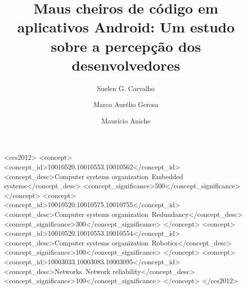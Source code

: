 \documentclass[sigconf]{acmart}
\begin{document}
\title{Maus cheiros de código em aplicativos Android: Um estudo sobre a percepção dos desenvolvedores}


\author{Suelen G. Carvalho}

\author{Marco Aurélio Gerosa}

\author{Maurício Aniche}



\begin{abstract}

\end{abstract}

%
%
\begin{CCSXML}
<ccs2012>
 <concept>
  <concept_id>10010520.10010553.10010562</concept_id>
  <concept_desc>Computer systems organization~Embedded systems</concept_desc>
  <concept_significance>500</concept_significance>
 </concept>
 <concept>
  <concept_id>10010520.10010575.10010755</concept_id>
  <concept_desc>Computer systems organization~Redundancy</concept_desc>
  <concept_significance>300</concept_significance>
 </concept>
 <concept>
  <concept_id>10010520.10010553.10010554</concept_id>
  <concept_desc>Computer systems organization~Robotics</concept_desc>
  <concept_significance>100</concept_significance>
 </concept>
 <concept>
  <concept_id>10003033.10003083.10003095</concept_id>
  <concept_desc>Networks~Network reliability</concept_desc>
  <concept_significance>100</concept_significance>
 </concept>
</ccs2012>  
\end{CCSXML}

\end{document}
